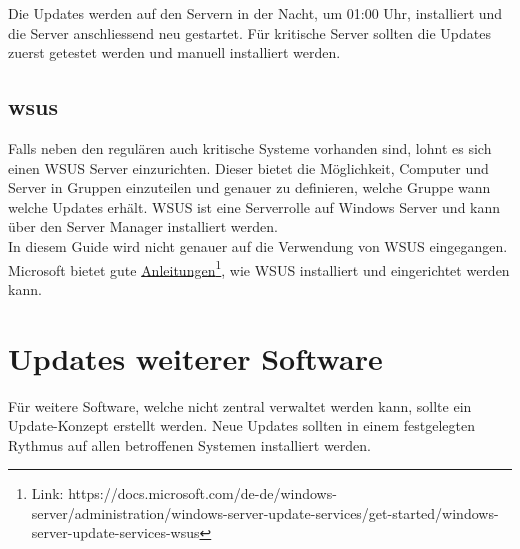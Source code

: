 Die Updates werden auf den Servern in der Nacht, um 01:00 Uhr, installiert und die Server anschliessend neu gestartet.
Für kritische Server sollten die Updates zuerst getestet werden und manuell installiert werden.

\subsection{\acrfull{wsus}}\label{subsec:wsus}
Falls neben den regulären auch kritische Systeme vorhanden sind, lohnt es sich einen WSUS Server einzurichten.
Dieser bietet die Möglichkeit, Computer und Server in Gruppen einzuteilen und genauer zu definieren, welche Gruppe wann welche Updates erhält.
WSUS ist eine Serverrolle auf Windows Server und kann über den Server Manager installiert werden.\\

In diesem Guide wird nicht genauer auf die Verwendung von WSUS eingegangen.
Microsoft bietet gute \href{https://docs.microsoft.com/de-de/windows-server/administration/windows-server-update-services/get-started/windows-server-update-services-wsus}{Anleitungen}\footnote{Link: https://docs.microsoft.com/de-de/windows-server/administration/windows-server-update-services/get-started/windows-server-update-services-wsus}, wie WSUS installiert und eingerichtet werden kann.


\section{Updates weiterer Software}
Für weitere Software, welche nicht zentral verwaltet werden kann, sollte ein Update-Konzept erstellt werden.
Neue Updates sollten in einem festgelegten Rythmus auf allen betroffenen Systemen installiert werden.